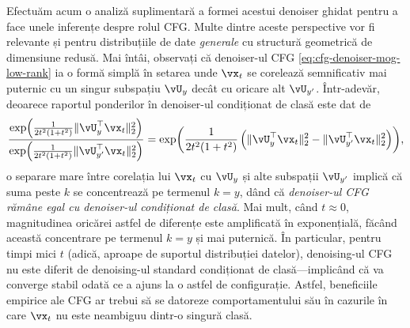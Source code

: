 \documentclass[../../book-main_ro.tex]{subfiles}
\begin{document}
\begin{example}
  Efectuăm acum o analiză suplimentară a formei acestui denoiser ghidat pentru
  a face unele inferențe despre rolul CFG. Multe dintre aceste perspective
  vor fi relevante și pentru distribuțiile de date \textit{generale} cu
  structură geometrică de dimensiune redusă.
  Mai întâi, observați că denoiser-ul CFG \eqref{eq:cfg-denoiser-mog-low-rank}
  ia o formă simplă în setarea unde $\vx_t$ se corelează semnificativ mai
  puternic cu un singur subspațiu $\vU_y$ decât cu oricare alt $\vU_{y'}$. Într-adevăr,
  deoarece raportul ponderilor în denoiser-ul condiționat de clasă este dat de
  \begin{equation}
    \frac{
      \exp\rp{\frac{1}{2t^{2}(1 + t^{2})}\norm{\vU_{y}^{\top}\vx_t}_{2}^{2}}
    }{
      \exp\rp{\frac{1}{2t^{2}(1 + t^{2})}\norm{\vU_{y'}^{\top}\vx_t}_{2}^{2}}
    }
    =
    \exp\rp{
      \frac{1}{2t^{2}(1 + t^{2})}\left(
      \norm{\vU_{y}^{\top}\vx_t}_{2}^{2}
      -
      \norm{\vU_{y'}^{\top}\vx_t}_{2}^{2}
      \right)
    },
  \end{equation}
  o separare mare între corelația lui $\vx_t$ cu $\vU_{y}$ și alte
  subspații $\vU_{y'}$ implică că suma peste $k$ se concentrează pe termenul $k=y$,
  dând că \textit{denoiser-ul CFG rămâne egal cu denoiser-ul
  condiționat de clasă}. Mai mult, când $t \approx 0$, magnitudinea
  oricărei astfel de diferențe este amplificată în exponențială, făcând această concentrare pe
  termenul $k=y$ și mai puternică. În particular, pentru timpi mici $t$ (adică, aproape de
  suportul distribuției datelor), denoising-ul CFG nu este diferit de
  denoising-ul standard condiționat de clasă---implicând că va converge stabil
  odată ce a ajuns la o astfel de configurație.
  Astfel, beneficiile empirice ale CFG ar trebui să se datoreze comportamentului său în cazurile
  în care $\vx_t$ nu este neambiguu dintr-o singură clasă.


\end{example}
\end{document}
